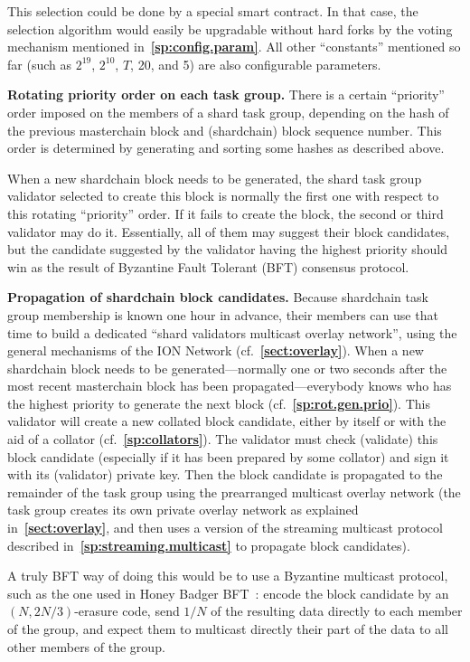 \documentclass[12pt,oneside]{article}
\def\makepoint#1{\medbreak\noindent{\bf #1.\ }}
\def\nxsubpoint{\refstepcounter{subsubsection}%
  \smallbreak\makepoint{\thesubsubsection}}
\def\refpoint#1{{\rm\textbf{\ref{#1}}}}
\let\ptref=\refpoint
\def\embt(#1.){\textbf{#1.}}
\begin{document}
This selection could be done by a special smart contract. In that
case, the selection algorithm would easily be upgradable without hard
forks by the voting mechanism mentioned
in~\ptref{sp:config.param}. All other ``constants'' mentioned so far
(such as $2^{19}$, $2^{10}$, $T$, 20, and 5) are also configurable
parameters.

\nxsubpoint\label{sp:rot.gen.prio} \embt(Rotating priority order on
each task group.)  There is a certain ``priority'' order imposed
on the members of a shard task group, depending on the hash of the
previous masterchain block and (shardchain) block sequence
number. This order is determined by generating and sorting some hashes
as described above.

When a new shardchain block needs to be generated, the shard task
group validator selected to create this block is normally the first
one with respect to this rotating ``priority'' order. If it fails to
create the block, the second or third validator may do
it. Essentially, all of them may suggest their block candidates, but
the candidate suggested by the validator having the highest priority
should win as the result of Byzantine Fault Tolerant (BFT) consensus
protocol.

\nxsubpoint\label{sp:sh.blk.cand.prop} \embt(Propagation of shardchain
block candidates.)  Because shardchain task group membership is
known one hour in advance, their members can use that time to build a
dedicated ``shard validators multicast overlay network'', using the
general mechanisms of the ION Network (cf.~\ptref{sect:overlay}). When
a new shardchain block needs to be generated---normally one or two
seconds after the most recent masterchain block has been
propagated---everybody knows who has the highest priority to generate
the next block (cf.~\ptref{sp:rot.gen.prio}). This validator will
create a new collated block candidate, either by itself or with the
aid of a collator (cf.~\ptref{sp:collators}). The validator must check
(validate) this block candidate (especially if it has been prepared by
some collator) and sign it with its (validator) private key. Then the
block candidate is propagated to the remainder of the task group
using the prearranged multicast overlay network (the task group
creates its own private overlay network as explained
in~\ptref{sect:overlay}, and then uses a version of the streaming
multicast protocol described in~\ptref{sp:streaming.multicast} to
propagate block candidates).

A truly BFT way of doing this would be to use a Byzantine multicast
protocol, such as the one used in Honey Badger BFT~\cite{HoneyBadger}:
encode the block candidate by an $(N,2N/3)$-erasure code, send $1/N$
of the resulting data directly to each member of the group, and expect
them to multicast directly their part of the data to all other members
of the group.
\end{document}
